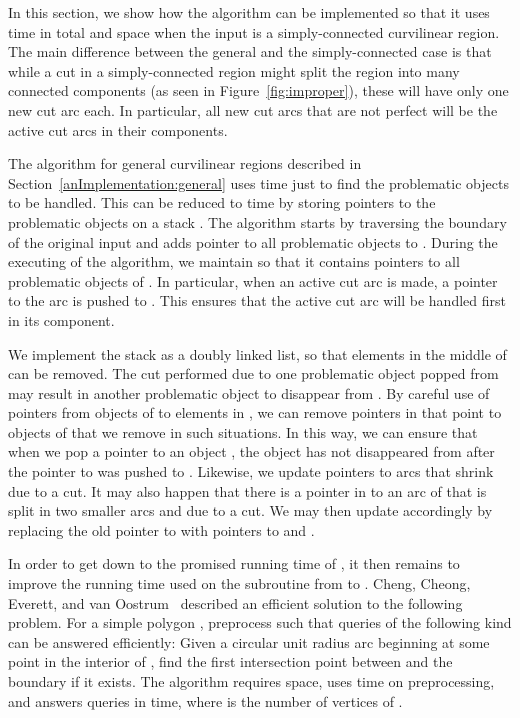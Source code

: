 \documentclass{article}
\begin{document}
In this section, we show how the algorithm can be implemented so
that it uses 
time in total and  space when the input  is a simply-connected curvilinear region.
The main difference between the general and the simply-connected case is that while a cut in a simply-connected region might split the region into many connected components (as seen in Figure~\ref{fig:improper}), these will have only one new cut arc each.
In particular, all new cut arcs that are not perfect will be the active cut arcs in their components.

The algorithm for general curvilinear regions described in Section~\ref{anImplementation:general} uses  time just to find the problematic objects to be handled.
This can be reduced to  time by storing pointers to the problematic objects on a stack .
The algorithm starts by traversing the boundary of the original input  and adds pointer to all problematic objects to .
During the executing of the algorithm, we maintain  so that it contains pointers to all problematic objects of .
In particular, when an active cut arc is made, a pointer to the arc is pushed to .
This ensures that the active cut arc will be handled first in its component.

We implement the stack  as a doubly linked list, so that elements in the middle of  can be removed.
The cut performed due to one problematic object  popped from  may result in another problematic object  to disappear from .
By careful use of pointers from objects of  to elements in , we can remove pointers in  that point to objects of  that we remove in such situations.
In this way, we can ensure that when we pop a pointer to an object , the object  has not disappeared from  after the pointer to  was pushed to .
Likewise, we update pointers to arcs that shrink due to a cut.
It may also happen that there is a pointer in  to an arc  of  that is split in two smaller arcs  and  due to a cut.
We may then update  accordingly by replacing the old pointer to  with pointers to  and .

In order to get down to the promised running time of , it then remains to improve the running time used on the subroutine  from  to .
Cheng, Cheong, Everett, and van Oostrum~\cite{Cheng04} described an efficient solution to the following problem.
For a simple polygon , preprocess  such that queries of the following
kind can be answered efficiently: Given a circular unit radius arc  beginning
at some point in the interior of , find the first intersection point between  and
the boundary  if it exists.
The algorithm requires  space, uses  time on preprocessing, and answers queries in  time, where  is the number of vertices of .
\end{document}
